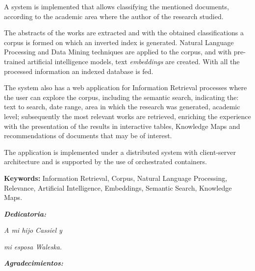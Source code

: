 \documentclass[
  12pt,
  openany]{book}
\begin{document}
A system is implemented that allows classifying the mentioned documents, according to the academic area where the author of the research studied.

The abstracts of the works are extracted and with the obtained classifications a corpus is formed on which an inverted index is generated. Natural Language Processing and Data Mining techniques are applied to the corpus, and with pre-trained artificial intelligence models, text \textit{embeddings} are created. With all the processed information an indexed database is fed.

The system also has a web application for Information Retrieval processes where the user can explore the corpus, including the semantic search, indicating the: text to search, date range, area in which the research was generated, academic level; subsequently the most relevant works are retrieved, enriching the experience with the presentation of the results in interactive tables, Knowledge Maps and recommendations of documents that may be of interest.

The application is implemented under a distributed system with client-server architecture and is supported by the use of orchestrated containers.

\vspace*{2cm}

\textbf{Keywords:} Information Retrieval, Corpus, Natural Language Processing, Relevance,  Artificial Intelligence, Embeddings, Semantic Search, Knowledge Maps.

\thispagestyle{empty}




\setlength{\abovedisplayskip}{-5pt}
\setlength{\abovedisplayshortskip}{-5pt}
\thispagestyle{empty}

\newpage
\begin{center}
\large{\textbf{\emph{\Huge{Dedicatoria:}}}}
\end{center}
\thispagestyle{empty}
\vspace*{5cm}
\thispagestyle{empty}
\begin{center} \Large \emph{A  mi hijo Cassiel y  } \end{center}
\vspace*{1cm}
\begin{center} \Large \emph{mi esposa Waleska.} \end{center}



\newpage
\begin{center}
\large{\textbf{\emph{\Huge{Agradecimientos:}}}}
\end{center}
\thispagestyle{empty}
\vspace*{2cm}
\thispagestyle{empty}
\end{document}
